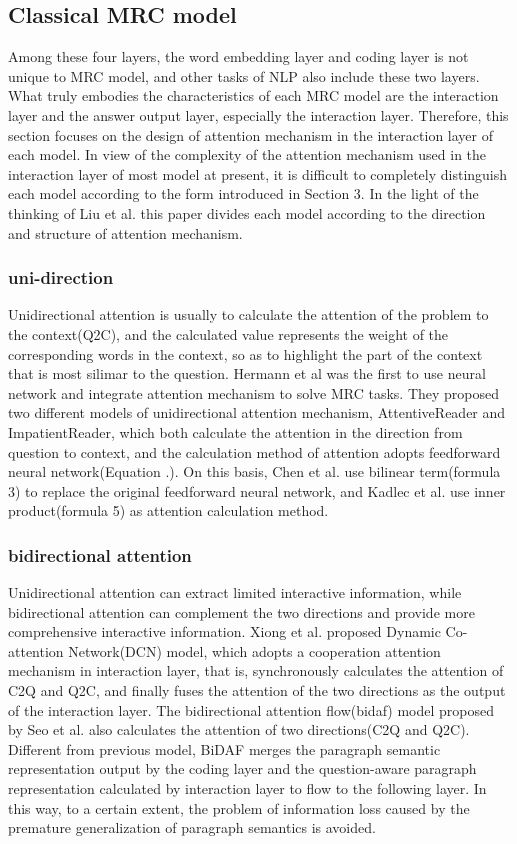 \subsection{Classical MRC model}
Among these four layers, the word embedding layer and coding layer is not unique to MRC model, and other tasks of NLP also include these two layers. 
What truly embodies the characteristics of each MRC model are the interaction layer and the answer output layer, especially the interaction layer. 
Therefore, this section focuses on the design of attention mechanism in the interaction layer of each model. 
In view of the complexity of the attention mechanism used in the interaction layer of most model at present, it is difficult to completely distinguish each 
model according to the form introduced in Section 3. In the light of the thinking of Liu et al. this paper divides each model according to the direction and structure 
of attention mechanism.

\subsubsection{uni-direction}
Unidirectional attention is usually to calculate the attention of the problem to the context(Q2C), and the calculated value represents the weight of the corresponding words in 
the context, so as to highlight the part of the context that is most silimar to the question. Hermann et al was the first to use neural network and integrate attention mechanism to 
solve MRC tasks. They proposed two different models of unidirectional attention mechanism, AttentiveReader and ImpatientReader, which both calculate the attention in the direction from question to context, and 
the calculation method of attention adopts feedforward neural network(Equation .). On this basis, Chen et al. use bilinear term(formula 3) to replace 
the original feedforward neural network, and Kadlec et al. use inner product(formula 5) as attention calculation method.
\subsubsection{bidirectional attention}
Unidirectional attention can extract limited interactive information, while bidirectional attention can complement the two directions and provide 
more comprehensive interactive information. Xiong et al. proposed Dynamic Co-attention Network(DCN) model, which adopts a cooperation attention mechanism in interaction layer, that is, 
synchronously calculates the attention of C2Q and Q2C, and finally fuses the attention of the two directions as the output of the interaction layer. 
The bidirectional attention flow(bidaf) model proposed by Seo et al. also calculates the attention of two directions(C2Q and Q2C). Different from previous model, BiDAF merges 
the paragraph semantic representation output by the coding layer and the question-aware paragraph representation calculated by interaction layer to flow to the following layer. 
In this way, to a certain extent, the problem of information loss caused by the premature generalization of paragraph semantics is avoided.

